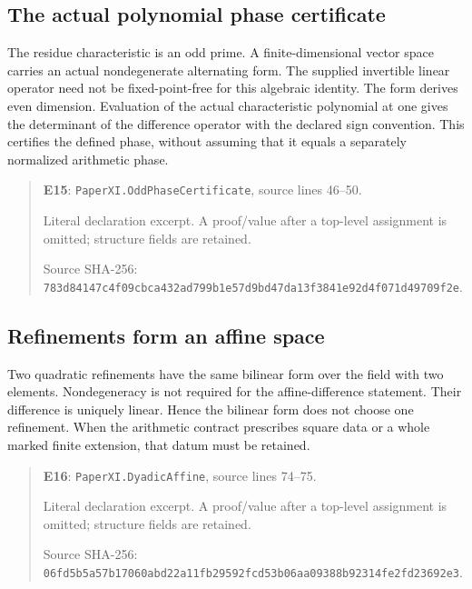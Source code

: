 \documentclass[10pt,oneside]{book}
\begin{document}
\subsection{The actual polynomial phase certificate}
\label{guide:E15}
The residue characteristic is an odd prime. A finite-dimensional vector space carries an actual nondegenerate alternating form. The supplied invertible linear operator need not be fixed-point-free for this algebraic identity.
The form derives even dimension. Evaluation of the actual characteristic polynomial at one gives the determinant of the difference operator with the declared sign convention. This certifies the defined phase, without assuming that it equals a separately normalized arithmetic phase.

\begin{quote}\footnotesize\textbf{E15}: \nolinkurl{PaperXI.OddPhaseCertificate}, source lines 46--50.\par Literal declaration excerpt. A proof/value after a top-level assignment is omitted; structure fields are retained.\par Source SHA-256: {\scriptsize\texttt{783d84147c4f09cbca432ad799b1e57d9bd47da13f3841e92d4f071d49709f2e}}.\end{quote}


\subsection{Refinements form an affine space}
\label{guide:E16}
Two quadratic refinements have the same bilinear form over the field with two elements. Nondegeneracy is not required for the affine-difference statement.
Their difference is uniquely linear. Hence the bilinear form does not choose one refinement. When the arithmetic contract prescribes square data or a whole marked finite extension, that datum must be retained.

\begin{quote}\footnotesize\textbf{E16}: \nolinkurl{PaperXI.DyadicAffine}, source lines 74--75.\par Literal declaration excerpt. A proof/value after a top-level assignment is omitted; structure fields are retained.\par Source SHA-256: {\scriptsize\texttt{06fd5b5a57b17060abd22a11fb29592fcd53b06aa09388b92314fe2fd23692e3}}.\end{quote}
\end{document}
